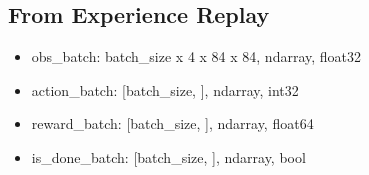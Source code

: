 \documentclass[11pt]{article}
\providecommand{\tightlist}{%
      \setlength{\itemsep}{0pt}\setlength{\parskip}{0pt}}
\begin{document}
\hypertarget{from-experience-replay}{%
\subsection{From Experience Replay}\label{from-experience-replay}}

\begin{itemize}
\tightlist
\item
  obs\_batch: batch\_size x 4 x 84 x 84, ndarray, float32
\item
  action\_batch: {[}batch\_size, {]}, ndarray, int32
\item
  reward\_batch: {[}batch\_size, {]}, ndarray, float64
\item
  is\_done\_batch: {[}batch\_size, {]}, ndarray, bool
\end{itemize}
\end{document}
